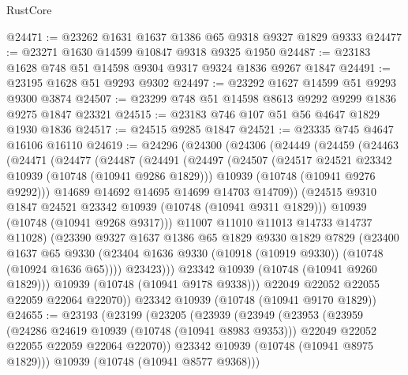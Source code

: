 \begin{lexlean}{RustCore}
\begin{coremodule}
@24471 := @23262 @1631 @1637 @1386 @65 @9318 @9327 @1829 @9333
@24477 := @23271 @1630 @14599 @10847 @9318 @9325 @1950
@24487 := @23183 @1628 @748 @51 @14598 @9304 @9317 @9324 @1836 @9267 @1847
@24491 := @23195 @1628 @51 @9293 @9302
@24497 := @23292 @1627 @14599 @51 @9293 @9300 @3874
@24507 := @23299 @748 @51 @14598 @8613 @9292 @9299 @1836 @9275 @1847 @23321
@24515 := @23183 @746 @107 @51 @56 @4647 @1829 @1930 @1836
@24517 := @24515 @9285 @1847
@24521 := @23335 @745 @4647 @16106 @16110
@24619 := @24296
    (@24300
      (@24306
        (@24449
          (@24459
            (@24463
              (@24471
                (@24477
                  (@24487
                    (@24491
                      (@24497
                        (@24507
                          (@24517 @24521 @23342 @10939 (@10748 (@10941 @9286 @1829)))
                          @10939
                          (@10748 (@10941 @9276 @9292)))
                        @14689
                        @14692
                        @14695
                        @14699
                        @14703
                        @14709))
                    (@24515 @9310 @1847 @24521 @23342 @10939 (@10748 (@10941 @9311 @1829)))
                    @10939
                    (@10748 (@10941 @9268 @9317)))
                  @11007
                  @11010
                  @11013
                  @14733
                  @14737
                  @11028)
                (@23390
                  @9327
                  @1637
                  @1386
                  @65
                  @1829
                  @9330
                  @1829
                  @7829
                  (@23400
                    @1637
                    @65
                    @9330
                    (@23404 @1636 @9330 (@10918 (@10919 @9330)) (@10748 (@10924 @1636 @65))))
                  @23423)))
            @23342
            @10939
            (@10748 (@10941 @9260 @1829)))
          @10939
          (@10748 (@10941 @9178 @9338)))
        @22049
        @22052
        @22055
        @22059
        @22064
        @22070))
    @23342
    @10939
    (@10748 (@10941 @9170 @1829))
@24655 := @23193
    (@23199
      (@23205
        (@23939
          (@23949
            (@23953
              (@23959
                (@24286 @24619 @10939 (@10748 (@10941 @8983 @9353)))
                @22049
                @22052
                @22055
                @22059
                @22064
                @22070))
            @23342
            @10939
            (@10748 (@10941 @8975 @1829)))
          @10939
          (@10748 (@10941 @8577 @9368)))

\end{coremodule}
\end{lexlean}
